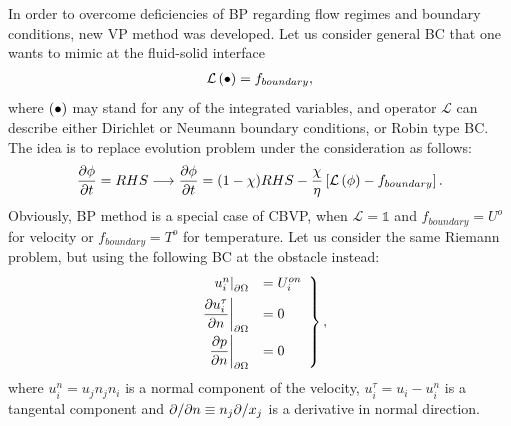 In order to overcome deficiencies of BP regarding flow regimes and boundary conditions, new VP method was developed. Let us consider general BC that one wants to mimic at the fluid-solid interface
\begin{align}
\mathcal L \left(\bullet\right) = f_{boundary},
\end{align}
where $\left(\bullet\right)$ may stand for any of the integrated variables, and operator $\mathcal L$ can describe either Dirichlet or Neumann boundary conditions, or Robin type BC. The idea is to replace evolution problem under the consideration as follows:
\begin{align}
\frac {\partial \phi}{\partial t} = RHS \longrightarrow \frac {\partial \phi}{\partial t} = (1-\chi)RHS - \frac \chi \eta \left[\mathcal L \left(\phi\right) - f_{boundary}\right]. \label{eq:CBVP}
\end{align}
Obviously, BP method is a special case of CBVP, when $\mathcal L = \mathds 1$ and $f_{boundary} = U^o$ for velocity or $f_{boundary} = T^o$ for temperature. Let us consider the same Riemann problem, but using the following BC at the obstacle instead:
\begin{align}
\left.\begin{array}{rl}
\left.u_i^n\right|_{\partial \Omega} &= U_i^{on} \\ [1ex]
\displaystyle \left.\frac {\partial u_i^\tau}{\partial n}\right|_{\partial \Omega} &= 0 \\ [2ex]
\displaystyle \left.\frac {\partial p}{\partial n}\right|_{\partial \Omega} &= 0
\end{array}\right\},
\end{align}
where $u^n_i = u_j n_j n_i$ is a normal component of the velocity, $u_i^\tau = u_i - u_i^n$ is a tangental component and $\partial / \partial n \equiv n_j \partial / x_j$ is a derivative in normal direction.

